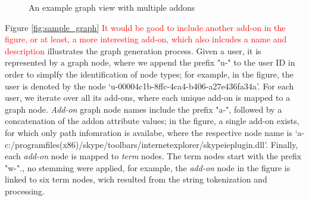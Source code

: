 \documentclass[11pt,oneside]{book}
\begin{document}
\begin{figure}
    \caption{An example graph view with multiple addons}
    \label{fig:sample_graph2}
  \end{figure}
  
Figure \ref{fig:sample_graph} \textcolor{red}{It would be good to include another add-on in the figure, or at least, a more interesting add-on, which also inlcudes a name and description} illustrates the graph generation process. Given a user, it is represented by a graph node, where we append the prefix "u-" to the user ID in order to simplfy the identification of node types; for example, in the figure, the user is denoted by the node `u-00004c1b-8ffc-4ca4-b406-a27e436fa34a'. For each user, we iterate over all its add-ons, where each unique add-on is mapped to a graph node. {\it Add-on} graph node names include the prefix "a-", followed by a concatenation of the addon attribute values; in the figure, a single add-on exists, for which only path infomration is availabe, where the respective node name is `a-c:/programfiles(x86)/skype/toolbars/internetexplorer/skypeieplugin.dll'. Finally, each {\it add-on} node is mapped to {\it term} nodes. The term nodes start with the prefix "w-"., no stemming were applied, for example, the {\it add-on} node in the figure is linked to six term nodes, wich resulted from the string tokenization and processing. 
  
\end{document}
